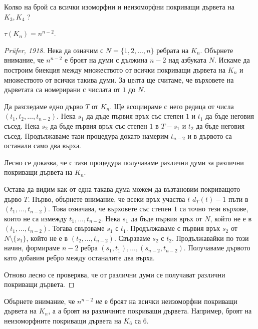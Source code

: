 \begin{problem}
  Колко на брой са всички изоморфни и неизоморфни покриващи дървета на $K_3,K_4$ ?
\end{problem}

\begin{thm}[Кейли] %
  $\tau(K_n) = n^{n-2}$.
\end{thm}
\begin{proof}[Pr\"ufer, 1918]
  Нека да означим с $N = \{1,2,\dots,n\}$ ребрата на $K_n$.
  Обърнете внимание, че $n^{n-2}$ е броят на думи с дължина $n-2$ над азбуката $N$.
  Искаме да построим биекция между множеството от всички покриващи дървета на $K_n$ 
  и множеството от всички такива думи. За целта ще считаме, че върховете на дърветата
  са номерирани с числата от $1$ до $N$.

  Да разгледаме едно дърво $T$ от $K_n$. Ще асоциираме с него редица от числа $(t_1,t_2,\dots,t_{n-2})$.
  Нека $s_1$ да дъде първия връх със степен $1$ и $t_1$ да бъде неговия съсед.
  Нека $s_2$ да бъде първия връх със степен $1$ в $T - s_1$ и $t_2$ да бъде неговия съсед.
  Продължаваме тази процедура докато намерим $t_{n-2}$ и в дървото са останали само два върха.

  Лесно се доказва, че с тази процедура получаваме различни думи за различни покриващи дървета на $K_n$.
  
  Остава да видим как от една такава дума можем да възтановим покриващото дърво $T$.
  Първо, обърнете внимание, че всеки връх участва $t$ $d_T(t) - 1$ пъти в $(t_1,\dots,t_{n-2})$.
  Това означава, че върховете със степен $1$ са точно тези върхове, които не са измежду $t_1,\dots, t_{n-2}$.
  Нека $s_1$ да бъде първия връх от $N$, който не е в $(t_1,\dots,t_{n-2})$. Тогава свързваме $s_1$ с $t_1$.
  Продължаваме с първия връх $s_2$ от $N\setminus\{s_1\}$, който не е в $(t_2,\dots,t_{n-2})$.
  Свързваме $s_2$ с $t_2$. 
  Продължавайки по този начин, формираме $n-2$ ребра $(s_1,t_1), \dots, (s_{n-2},t_{n-2})$.
  Получаваме дървото като добавим ребро между останалите два върха.

  Отново лесно се проверява, че от различни думи се получават различни покриващи дървета.
\end{proof}

\begin{remark}
  Обърнете внимание, че $n^{n-2}$ {\em не} е броят на всички неизоморфни покриващи дървета на $K_n$, а
  а броят на различните покриващи дървета. Например, броят на неизоморфните покриващи дървета на $K_6$
  са 6.
\end{remark}

